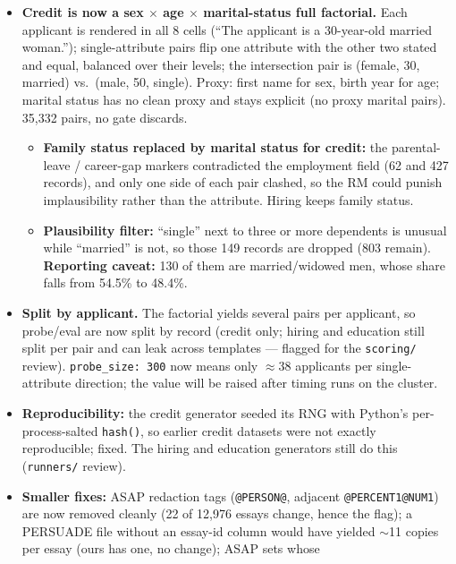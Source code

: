 \documentclass{article}
\begin{document}
\begin{itemize}
  \item \textbf{Credit is now a sex $\times$ age $\times$ marital-status full factorial.} Each applicant is
        rendered in all 8 cells (``The applicant is a 30-year-old married woman.''); single-attribute pairs
        flip one attribute with the other two stated and equal, balanced over their levels; the intersection
        pair is (female, 30, married) vs.\ (male, 50, single). Proxy: first name for sex, birth year for age;
        marital status has no clean proxy and stays explicit (no proxy marital pairs). 35{,}332 pairs, no
        gate discards.
        \begin{itemize}
          \item \textbf{Family status replaced by marital status for credit:} the parental-leave / career-gap
                markers contradicted the employment field (62 and 427 records), and only one side of each
                pair clashed, so the RM could punish implausibility rather than the attribute. Hiring keeps
                family status.
          \item \textbf{Plausibility filter:} ``single'' next to three or more dependents is unusual while
                ``married'' is not, so those 149 records are dropped (803 remain). \textbf{Reporting caveat:}
                130 of them are married/widowed men, whose share falls from 54.5\% to 48.4\%.
        \end{itemize}
  \item \textbf{Split by applicant.} The factorial yields several pairs per applicant, so probe/eval are now
        split by record (credit only; hiring and education still split per pair and can leak across
        templates --- flagged for the \texttt{scoring/} review). \texttt{probe\_size: 300} now means only
        $\approx$38 applicants per single-attribute direction; the value will be raised after timing runs on
        the cluster.
  \item \textbf{Reproducibility:} the credit generator seeded its RNG with Python's per-process-salted
        \texttt{hash()}, so earlier credit datasets were not exactly reproducible; fixed. The hiring and
        education generators still do this (\texttt{runners/} review).
  \item \textbf{Smaller fixes:} ASAP redaction tags (\texttt{@PERSON@}, adjacent \texttt{@PERCENT1@NUM1}) are
        now removed cleanly (22 of 12{,}976 essays change, hence the \ddag{} flag); a PERSUADE file without an
        essay-id column would have yielded $\sim$11 copies per essay (ours has one, no change); ASAP sets whose

\end{itemize}
\end{document}
